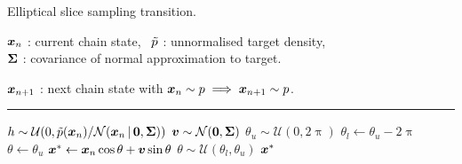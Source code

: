 \begin{algorithm}[!t]
\caption{Elliptical slice sampling transition.}
\label{alg:elliptical-slice-sampling}
\begin{algorithmic}
\small
    \Require
    $\boldsymbol{x}_n$ : current chain state,~
    $\tilde{p}$ : unnormalised target density,\\
    $\boldsymbol{\Sigma}$ : covariance of normal approximation to target.
    \Ensure\raggedright
    $\boldsymbol{x}_{n+1}$ : next chain state with $\boldsymbol{x}_n \sim p \implies \boldsymbol{x}_{n+1} \sim p$.
\end{algorithmic}
\hrule
\small
\begin{algorithmic}[1]
  \State $h \sim \mathcal{U}\lpa 0,\utgtdens(\vct{x}_n) / \nrm{\vct{x}_n \gvn \vct{0}, \mtx{\Sigma}}\rpa$ 
  \State $\vct{v} \sim \nrm{\vct{0}, \mtx{\Sigma}}$ 
  \State $\theta_u \sim \mathcal{U}(0,2\uppi)$ 
  \State $\theta_l \gets \theta_u - 2\uppi$
  \State $\theta \gets \theta_u$
    \State $\boldsymbol{x}^* \gets \boldsymbol{x}_n \cos\theta + \boldsymbol{v} \sin\theta$  
     
       
      \State $\theta \sim \mathcal{U}(\theta_l, \theta_u)$ 
    \Else
      \State \Return $\boldsymbol{x}^*$
    \EndIf
  \EndWhile
\end{algorithmic}
\end{algorithm}






